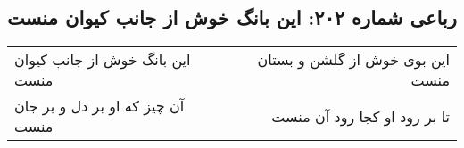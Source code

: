 \begin{center}
\section*{رباعی شماره ۲۰۲: این بانگ خوش از جانب کیوان منست}
\label{sec:0202}
\begin{longtable}{l p{0.5cm} r}
این بانگ خوش از جانب کیوان منست
&&
این بوی خوش از گلشن و بستان منست
\\
آن چیز که او بر دل و بر جان منست
&&
تا بر رود او کجا رود آن منست
\\
\end{longtable}
\end{center}
